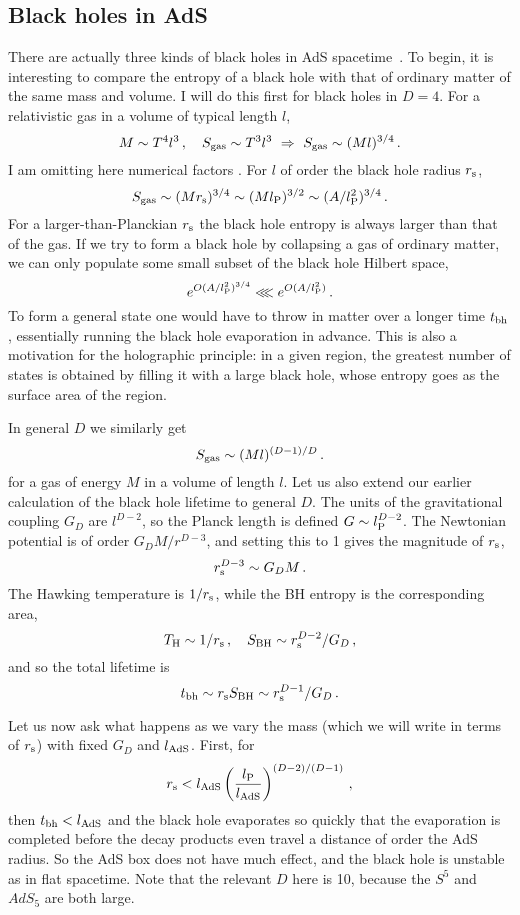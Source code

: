 \documentclass[12pt]{article}
\newcommand{\be}{\begin{equation}}
\newcommand{\ee}{\end{equation}}
\newcommand{\rmx}{\rm}
\newcommand{\rs}{r_{\rmx s}}
\newcommand{\lp}{l_{\rmx P}}
\begin{document}
\subsection{Black holes in AdS}

There are actually three kinds of black holes in AdS spacetime~\cite{Horowitz:1999uv}.  To begin, it is interesting to compare 
the entropy of a black hole with that of ordinary matter of the same mass and volume.  I will do this first for black holes in $D=4$.  
For a relativistic gas in a volume of typical length $l$,
\be
M \sim T^4 l^3 \,,\quad S_{\rmx gas} \sim T^3 l^3\ \Rightarrow\ S_{\rmx gas} \sim (Ml)^{3/4} \,.
\ee
I am omitting here numerical factors%
.
For  $l$ of order the black hole radius $\rs$,
\be
S_{\rmx gas} \sim (M\rs)^{3/4} \sim (M\lp)^{3/2} \sim (A/\lp^2)^{3/4} \,.
\ee
For a larger-than-Planckian $\rs$ the black hole entropy is always larger than that of the gas.  If we try to form a black hole by collapsing a gas of ordinary matter, we can only populate some small subset of the black hole Hilbert space,
\be
e^{O(A/\lp^2)^{3/4}} \lll e^{O(A/\lp^2)}\,.
\ee
To form a general state one would have to throw in matter over a longer time $t_{\rm bh}$, essentially running the black hole evaporation in advance.  This is also a motivation for the holographic principle: in a given region, the greatest number of states is obtained by filling it with a large black hole, whose entropy goes as the surface area of the region.  

In general $D$ we similarly get 
\be
S_{\rmx gas} \sim (Ml)^{(D-1)/D} \,. \label{gass}
\ee
for a gas of energy $M$ in a volume of length $l$.  Let us also extend our earlier calculation of the black hole lifetime to general $D$.
The units of the gravitational coupling $G_D$ are $l^{D-2}$, so the Planck length is defined $G \sim l_{\rmx P}^{D-2}$.
The Newtonian potential is of order $G_D M / r^{D-3}$, and setting this to 1 gives the magnitude of $\rs$,
\be
 \rs^{D-3} \sim G_D M\,.
\ee
The Hawking temperature is $1/\rs$, while the BH entropy is the corresponding area,
\be
T_{\rmx H}\sim 1/\rs\,,\quad   S_{\rmx BH} \sim  \rs^{D-2}/G_D \,, \label{bhs}
\ee
and so the total lifetime is 
\be
t_{\rm bh} \sim \rs S_{\rmx BH} \sim  \rs^{D-1}/G_D \,.
\ee

Let us now ask what happens as we vary the mass (which we will write in terms of $\rs$) with fixed $G_D$ and $l_{\rm AdS}$.  First, for 
\be
\rs <  l_{\rm AdS} \left(\frac{l_{\rmx P}}{l_{\rm AdS} }\right)^{(D-2)/(D-1)} \,,
\ee
then $t_{\rm bh} < l_{\rm AdS}$ and the black hole evaporates so quickly that the evaporation is completed before the decay products 
even travel a distance of order the AdS radius. So the AdS box does not have much effect, and the black hole is unstable as in flat spacetime.  Note that the relevant $D$ here is 10, because the $S^5$ and $AdS_5$ are both large.
\end{document}
